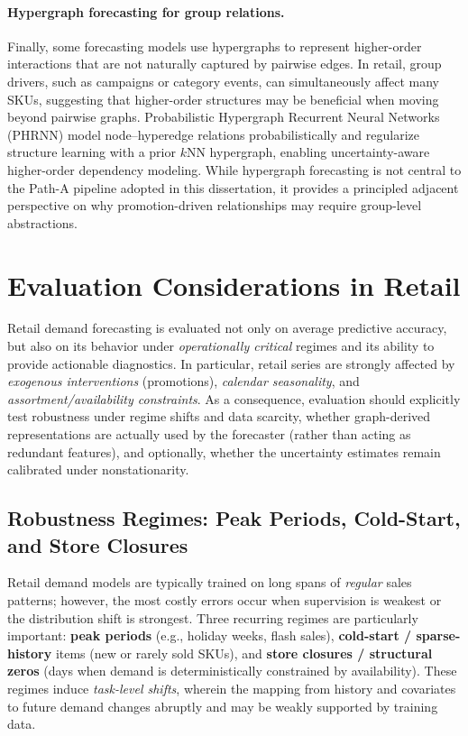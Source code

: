 \paragraph{Hypergraph forecasting for group relations.}
Finally, some forecasting models use hypergraphs to represent higher-order interactions that are not naturally captured by pairwise edges. In retail, group drivers, such as campaigns or category events, can simultaneously affect many SKUs, suggesting that higher-order structures may be beneficial when moving beyond pairwise graphs. Probabilistic Hypergraph
Recurrent Neural Networks (PHRNN) model node--hyperedge relations probabilistically and regularize structure learning
with a prior $k$NN hypergraph, enabling uncertainty-aware higher-order dependency modeling. While hypergraph forecasting
is not central to the Path-A pipeline adopted in this dissertation, it provides a principled adjacent perspective on
why promotion-driven relationships may require group-level abstractions.

\section{Evaluation Considerations in Retail}
\label{sec:eval-retail}

Retail demand forecasting is evaluated not only on average predictive accuracy, but also on its
behavior under \emph{operationally critical} regimes and its ability to provide actionable diagnostics.
In particular, retail series are strongly affected by \emph{exogenous interventions} (promotions),
\emph{calendar seasonality}, and \emph{assortment/availability constraints}. As a consequence,
evaluation should explicitly test  robustness under regime shifts and data scarcity, whether
graph-derived representations are actually used by the forecaster (rather than acting as redundant
features), and optionally, whether the uncertainty estimates remain calibrated under nonstationarity.

\subsection{Robustness Regimes: Peak Periods, Cold-Start, and Store Closures}
\label{sec:robustness-regimes}

Retail demand models are typically trained on long spans of \emph{regular} sales patterns; however, the most costly errors occur when supervision is weakest or the distribution shift is strongest. Three recurring regimes are
particularly important: \textbf{peak periods} (e.g., holiday weeks, flash sales), \textbf{cold-start / sparse-history}
items (new or rarely sold SKUs), and \textbf{store closures / structural zeros} (days when demand is deterministically
constrained by availability). These regimes induce \emph{task-level shifts}, wherein the mapping from history and covariates to future demand changes abruptly and may be weakly supported by training data.

